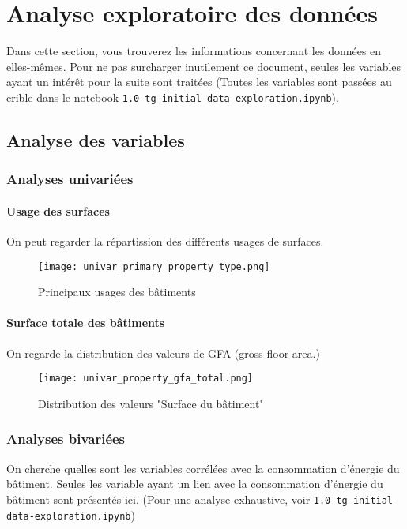 \section{Analyse exploratoire des données}

Dans cette section, vous trouverez les informations concernant les données en
elles-mêmes. Pour ne pas surcharger inutilement ce document, seules les
variables ayant un intérêt pour la suite sont traitées (Toutes les variables
sont passées au crible dans le notebook \Verb+1.0-tg-initial-data-exploration.ipynb+).

\subsection{Analyse des variables}

\subsubsection{Analyses univariées}

\paragraph{Usage des surfaces} On peut regarder la répartission des différents
usages de surfaces.
\begin{figure}[H]
  \texttt{[image: univar\_primary\_property\_type.png]}
  \caption{Principaux usages des bâtiments}
  \label{}
\end{figure}

\paragraph{Surface totale des bâtiments} On regarde la distribution des valeurs
de GFA (gross floor area.)
\begin{figure}[H]
  \texttt{[image: univar\_property\_gfa\_total.png]}
  \caption{Distribution des valeurs "Surface du bâtiment"}
  \label{}
\end{figure}


\subsubsection{Analyses bivariées}

On cherche quelles sont les variables corrélées avec la consommation d'énergie
du bâtiment. Seules les variable ayant un lien avec la consommation d'énergie du
bâtiment sont présentés ici. (Pour une analyse exhaustive, voir \Verb+1.0-tg-initial-data-exploration.ipynb+)

